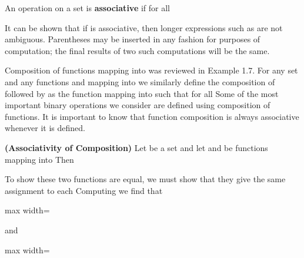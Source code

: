 \documentclass[11pt,oneside]{article}
\begin{document}
\begin{BookBody}
 An operation on a set  is\textbf{ associative} if  for all \BookEnd{\blacksquare}

It can be shown that if \BookInline{\ast } is associative, then longer expressions such as   are not ambiguous. Parentheses may be inserted in any fashion for purposes of computation; the final results of two such computations will be the same.

\end{BookBody}

\BookNarrativetrue

\begin{BookBody}

Composition of functions mapping  into  was reviewed in Example 1.7. For any set  and any functions  and  mapping  into  we similarly define the composition  of  followed by  as the function mapping  into  such that  for all  Some of the most important binary operations we consider are defined using composition of functions. It is important to know that function composition is always associative whenever it is defined.

 \textbf{(Associativity of Composition)} Let  be a set and let  and  be functions mapping  into  Then 

 To show these two functions are equal, we must show that they give the same assignment to each  Computing we find that

\begin{center}\begin{adjustbox}{max width=\linewidth}\end{adjustbox}\end{center}

\noindent and

\begin{center}\begin{adjustbox}{max width=\linewidth}\end{adjustbox}\end{center}


\end{BookBody}
\end{document}
